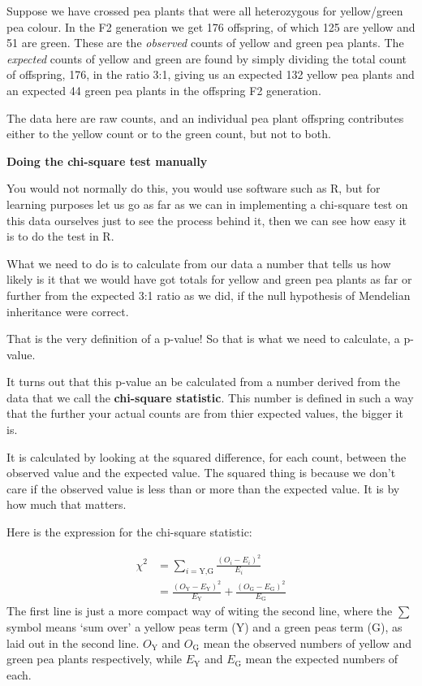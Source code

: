 \documentclass[
  letterpaper,
  DIV=11,
  numbers=noendperiod]{scrreprt}
\begin{document}
Suppose we have crossed pea plants that were all heterozygous for
yellow/green pea colour. In the F2 generation we get 176 offspring, of
which 125 are yellow and 51 are green. These are the \emph{observed}
counts of yellow and green pea plants. The \emph{expected} counts of
yellow and green are found by simply dividing the total count of
offspring, 176, in the ratio 3:1, giving us an expected 132 yellow pea
plants and an expected 44 green pea plants in the offspring F2
generation.

The data here are raw counts, and an individual pea plant offspring
contributes either to the yellow count or to the green count, but not to
both.

\textbf{Doing the chi-square test manually}

You would not normally do this, you would use software such as R, but
for learning purposes let us go as far as we can in implementing a
chi-square test on this data ourselves just to see the process behind
it, then we can see how easy it is to do the test in R.

What we need to do is to calculate from our data a number that tells us
how likely is it that we would have got totals for yellow and green pea
plants as far or further from the expected 3:1 ratio as we did, if the
null hypothesis of Mendelian inheritance were correct.

That is the very definition of a p-value! So that is what we need to
calculate, a p-value.

It turns out that this p-value an be calculated from a number derived
from the data that we call the \textbf{chi-square statistic}. This
number is defined in such a way that the further your actual counts are
from thier expected values, the bigger it is.

It is calculated by looking at the squared difference, for each count,
between the observed value and the expected value. The squared thing is
because we don't care if the observed value is less than or more than
the expected value. It is by how much that matters.

Here is the expression for the chi-square statistic:

\[
\begin{align}
\chi^2 &= \sum_{i=\text{Y,G}}\frac{(O_i-E_i)^2}{E_i}\\ &=\frac{(O_\text{Y}-E_\text{Y})^2}{E_\text{Y}} + \frac{(O_\text{G}-E_\text{G})^2}{E_\text{G}}
\end{align}
\] The first line is just a more compact way of witing the second line,
where the \(\sum\) symbol means `sum over' a yellow peas term (Y) and a
green peas term (G), as laid out in the second line. \(O_\text{Y}\) and
\(O_\text{G}\) mean the observed numbers of yellow and green pea plants
respectively, while \(E_\text{Y}\) and \(E_\text{G}\) mean the expected
numbers of each.
\end{document}
